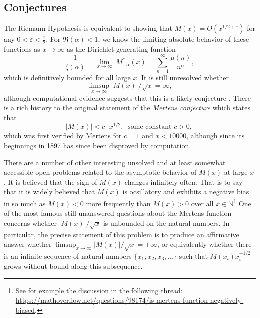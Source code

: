 \documentclass[11pt,reqno,a4letter]{article}
\numberwithin{figure}{section}
\numberwithin{table}{section}
\theoremstyle{plain}
\numberwithin{theorem}{section}
\theoremstyle{definition}
\begin{document}
\subsection{Conjectures} 

The Riemann Hypothesis is equivalent to showing that 
$M(x) = O\left(x^{1/2+\varepsilon}\right)$ for any 
$0 < \varepsilon < \frac{1}{2}$. 
For $\Re(\alpha) < 1$, we know the limiting absolute behavior of these functions as 
$x\rightarrow\infty$ as the Dirichlet generating function 
\[
\frac{1}{\zeta(\alpha)} = \lim_{x\longrightarrow\infty}\ M_{-\alpha}^{\ast}(x) = 
     \sum_{n=1}^{\infty} \frac{\mu(n)}{n^{\alpha}}, 
\] 
which is definitively bounded for all large $x$. 
It is still unresolved whether 
\[ 
\limsup_{x\rightarrow\infty} |M(x)| / \sqrt{x} = \infty, 
\] 
although computational evidence suggests that this is a likely conjecture 
\cite{ORDER-MERTENSFN,HURST-2017}. 
There is a rich history to the original statement of the \emph{Mertens conjecture} which 
states that 
\[ 
|M(x)| < c \cdot x^{1/2},\ \text{ some constant $c > 0$, }
\] 
which was first verified by Mertens for $c = 1$ and $x < 10000$, 
although since its beginnings in 1897 has since been disproved by computation. 

There are a number of other interesting unsolved and at 
least somewhat accessible open problems 
related to the asymptotic behavior of $M(x)$ at large $x$. 
It is believed that the sign of $M(x)$ changes infinitely often. 
That is to say that it is widely believed that $M(x)$ is 
ocsillatory and exhibits a negative bias in so much as 
$M(x) < 0$ more frequently than $M(x) > 0$ over all 
$x \in \mathbb{N}$\footnote{ 
     See for example the discussion in the following thread: \\ 
     \url{https://mathoverflow.net/questions/98174/is-mertens-function-negatively-biased}. 
}
One of the most famous still unanswered questions about the Mertens 
function concerns whether $|M(x)| / \sqrt{x}$ is unbounded on the 
natural numbers. In particular, the precise statement of this 
problem is to produce an affirmative answer whether 
$\limsup_{x \rightarrow \infty} |M(x)| / \sqrt{x} = +\infty$, or 
equivalently whether there is an infinite sequence of natural numbers 
$\{x_1, x_2, x_3, \ldots\}$ such that $M(x_i) x_i^{-1/2}$ grows without 
bound along this subsequence. 
\end{document}
